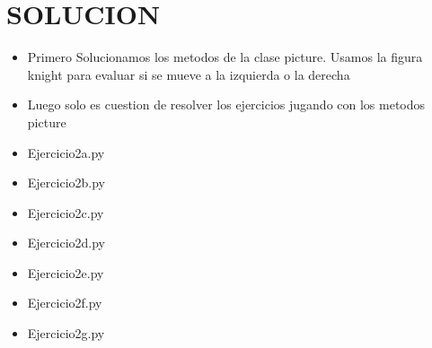 \documentclass{article}
\begin{document}
\section{SOLUCION}
\begin{itemize}
    \item Primero Solucionamos los metodos de la clase picture. Usamos la figura knight para evaluar si se mueve a la izquierda o la derecha \\

    

    \item Luego solo es cuestion de resolver los ejercicios jugando con los metodos picture \\

    \item Ejercicio2a.py \\
    

        \item Ejercicio2b.py \\
    

        \item Ejercicio2c.py \\
    

        \item Ejercicio2d.py \\
    

        \item Ejercicio2e.py \\
    

        \item Ejercicio2f.py \\
    

        \item Ejercicio2g.py \\
    
    
    
\end{itemize}
\end{document}
